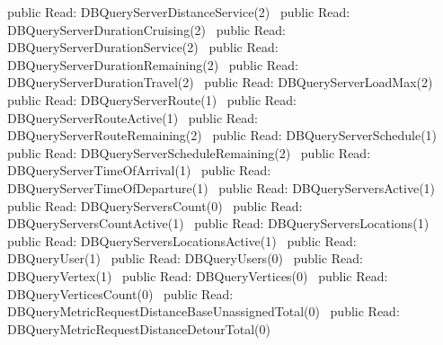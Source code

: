 public \LA{}Read: DBQueryServerDistanceService(2)~{\nwtagstyle{}}\RA{}
public \LA{}Read: DBQueryServerDurationCruising(2)~{\nwtagstyle{}}\RA{}
public \LA{}Read: DBQueryServerDurationService(2)~{\nwtagstyle{}}\RA{}
public \LA{}Read: DBQueryServerDurationRemaining(2)~{\nwtagstyle{}}\RA{}
public \LA{}Read: DBQueryServerDurationTravel(2)~{\nwtagstyle{}}\RA{}
public \LA{}Read: DBQueryServerLoadMax(2)~{\nwtagstyle{}}\RA{}
public \LA{}Read: DBQueryServerRoute(1)~{\nwtagstyle{}}\RA{}
public \LA{}Read: DBQueryServerRouteActive(1)~{\nwtagstyle{}}\RA{}
public \LA{}Read: DBQueryServerRouteRemaining(2)~{\nwtagstyle{}}\RA{}
public \LA{}Read: DBQueryServerSchedule(1)~{\nwtagstyle{}}\RA{}
public \LA{}Read: DBQueryServerScheduleRemaining(2)~{\nwtagstyle{}}\RA{}
public \LA{}Read: DBQueryServerTimeOfArrival(1)~{\nwtagstyle{}}\RA{}
public \LA{}Read: DBQueryServerTimeOfDeparture(1)~{\nwtagstyle{}}\RA{}
public \LA{}Read: DBQueryServersActive(1)~{\nwtagstyle{}}\RA{}
public \LA{}Read: DBQueryServersCount(0)~{\nwtagstyle{}}\RA{}
public \LA{}Read: DBQueryServersCountActive(1)~{\nwtagstyle{}}\RA{}
public \LA{}Read: DBQueryServersLocations(1)~{\nwtagstyle{}}\RA{}
public \LA{}Read: DBQueryServersLocationsActive(1)~{\nwtagstyle{}}\RA{}
public \LA{}Read: DBQueryUser(1)~{\nwtagstyle{}}\RA{}
public \LA{}Read: DBQueryUsers(0)~{\nwtagstyle{}}\RA{}
public \LA{}Read: DBQueryVertex(1)~{\nwtagstyle{}}\RA{}
public \LA{}Read: DBQueryVertices(0)~{\nwtagstyle{}}\RA{}
public \LA{}Read: DBQueryVerticesCount(0)~{\nwtagstyle{}}\RA{}
\nwendcode{}\nwdocspar
{}
\nwenddocs{}\plusendmoddef
public \LA{}Read: DBQueryMetricRequestDistanceBaseUnassignedTotal(0)~{\nwtagstyle{}}\RA{}
public \LA{}Read: DBQueryMetricRequestDistanceDetourTotal(0)~{\nwtagstyle{}}\RA{}
